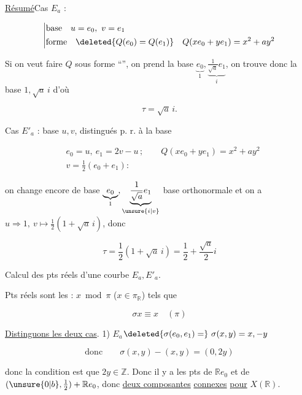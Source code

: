 
\uline{Résumé}\quad Cas $E_a$ :

\[
\left|\begin{aligned}
&\text{base}\quad u=e_0,\ v=e_1\\
&\text{forme}\quad\deleted{Q(e_0)=Q(e_1)}\quad Q(xe_0+ye_1)=x^2+ay^2
\end{aligned}\right.
\]

Si on veut  faire $Q$ sous forme ``'', on prend la  base $\underbrace{e_0}_{1},\underbrace{\frac{1}{\sqrt a}e_1}_{i}$, on trouve donc la base $1,\sqrt a\,i$ d'où

\[
\boxed{\tau=\sqrt a\,i}.
\]

Cas $E'_a$ : base $u,v$,   distingués p. r. à la base

\[
\begin{aligned}
&e_0=u,\ e_1=2v-u\,;\qquad Q(xe_0+ye_1)=x^2+ay^2\\
&v=\tfrac12(e_0+e_1):
\end{aligned}
\]

on  change encore de base $\underbrace{e_0}_{1},\underbrace{\frac{1}{\sqrt a}e_1}_{\unsure{i|v}}$ base orthonormale et on a $u\Rightarrow1,\ v\longmapsto\frac12(1+\sqrt a\,i)$, donc

\[
\boxed{\tau=\frac12(1+\sqrt a\,i)}=\frac12+\frac{\sqrt a}{2}i
\]


Calcul  des pts réels d'une courbe $E_a,E'_a$.

Pts réels sont les : $x\bmod\pi$ ($x\in\pi_{\mathbb R}$) tels que

\[
\sigma x\equiv x\quad(\pi)
\]

\uline{Distinguons les deux cas}. 1) \uline{$E_a$}\quad $\deleted{\sigma(e_0,e_1)=}\ \sigma(x,y)=x,-y$

\[
\text{donc}\qquad \sigma(x,y)-(x,y)=(0,2y)
\]

donc la condition est que $2y\in\mathbb Z$. Donc il y a  les pts de  $\mathbb R e_0$ et de  $(\unsure{0|b},\tfrac12)+\mathbb R e_0$, donc \uline{deux composantes} \uline{connexes} \uline{pour} $X(\mathbb R)$.

